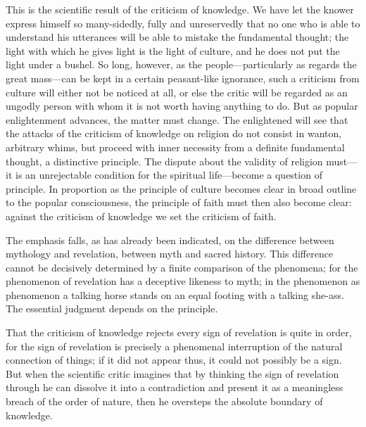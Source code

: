 \documentclass[12pt]{book}
\newcommand{\opage}[1]{\marginnote{\footnotesize\textit{[#1]}}}
\begin{document}
This is the scientific result of the criticism of knowledge. We have let
the knower express himself so many-sidedly, fully and unreservedly that
no one who is able to understand his utterances will be able to mistake
the fundamental thought; the light with which he gives light is the
light of culture, and he does not put the light under a bushel. So long,
however, as the people---particularly as regards the great mass---can
be kept in a certain peasant-like ignorance, such a criticism from
culture will either not be noticed at all, or else the critic will be
regarded as an ungodly person with whom it is not worth having anything
to do.
But as popular enlightenment advances, the matter must change. The
enlightened will see that the attacks of the criticism of knowledge on
religion do not consist in wanton, arbitrary
\opage{166}\setcounter{footnote}{0}%
whims, but proceed with inner necessity from a definite fundamental
thought, a distinctive principle. The dispute about the validity of
religion must---it is an unrejectable condition for the spiritual
life---become a question of principle. In proportion as the principle
of culture becomes clear in broad outline to the popular consciousness,
the principle of faith must then also become clear: against the
criticism of knowledge we set the criticism of faith.

The emphasis falls, as has already been indicated, on the difference
between mythology and revelation, between myth and sacred history. This
difference cannot be decisively determined by a finite comparison of
the phenomena; for the phenomenon of revelation has a deceptive likeness
to myth; in the phenomenon as phenomenon a talking horse stands on an
equal footing with a talking she-ass. The essential judgment depends on
the principle.

That the criticism of knowledge rejects every sign of revelation is
quite in order, for the sign of revelation is precisely a phenomenal
interruption of the natural connection of things; if it did not appear
thus, it could not possibly be a sign. But when the scientific critic
imagines that by thinking the sign of revelation through he can
dissolve it into a contradiction and present it as a meaningless breach
of the order of nature, then he oversteps the absolute boundary of
knowledge.
\end{document}
